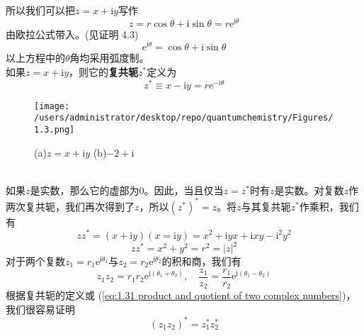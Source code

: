 	所以我们可以把$z = x+ \mathrm{i}y$写作
	\begin{equation}
		z = r \cos \theta + \mathrm{i} \sin \theta = r \mathrm{e}^{\mathrm{i} \theta}
		\label{eq:1.27 Triangular forms of complex numbers}
	\end{equation}	
	由欧拉公式带入。(见证明 4.3)
	\begin{equation}
		\boxed{\mathrm{e}^{\mathrm{i}\theta} = \cos \theta + \mathrm{i} \sin\theta}
		\label{eq:1.28 Euler's equation}
	\end{equation}
	以上方程中的$\theta$角均采用弧度制。\\
	\indent 如果$z = x + \mathrm{i}y$，则它的\textbf{复共轭}$z^{\ast}$定义为
	\begin{equation}
		z^{\ast} \equiv x - \mathrm{i}y = r \mathrm{e} ^{-\mathrm{i}\theta}
		\label{eq:1.29 definition of complexconjugate}
	\end{equation}
		\begin{figure}[h!]
		\centering
		\texttt{[image: /users/administrator/desktop/repo/quantumchemistry/Figures/1.3.png]}  %
		\caption{(a)$z = x + \mathrm{i}y$  (b)$-2+\mathrm{i}$}
		\label{fig:1.3}
	\end{figure}\\
	\indent 如果$z$是实数，那么它的虚部为0。因此，当且仅当$z = z^{\ast}$时有$z$是实数。对复数$z$作两次复共轭，我们再次得到了$z$，所以$\left(z^{\ast}\right)^{\ast}=z$。将$z$与其复共轭$z^{\ast}$作乘积，我们有
	\begin{equation*}
		zz^{\ast} = \left(x + \mathrm{i}y\right)\left(x= \mathrm{i}y\right) = x^2+\mathrm{i}yx+\mathrm{i}xy-\mathrm{i}^2y^2
	\end{equation*}
	\begin{equation}
		\boxed{zz^{\ast} = x^2+y^2=r^2=\left|z\right|^2}
		\label{eq:1.30 product of z and its complex conjugate}
	\end{equation}
	对于两个复数$z_1=r_1\mathrm{e}^{\mathrm{i}\theta_1}$与$z_2 = r_2\mathrm{e}^{\mathrm{i}\theta_2}$的积和商，我们有
	\begin{equation}
		z_1z_2 = r_1r_2\mathrm{e}^{\mathrm{i}\left(\theta_1+\theta_2\right)}, \quad \frac{z_1}{z_2} = \frac{r_1}{r_2}\mathrm{e}^{\mathrm{i} \left(\theta_1 - \theta_2\right)}
		\label{eq:1.31 product and quotient of two complex numbers}
	\end{equation}
	\indent 根据复共轭的定义或 (\ref{eq:1.31 product and quotient of two complex numbers})，我们很容易证明
	\begin{equation}
		\boxed{\left(z_1z_2\right)^{\ast} = z_1^{\ast} z_2^{\ast}}
		\label{eq:1.32 properties of complex conjugate}
	\end{equation}
